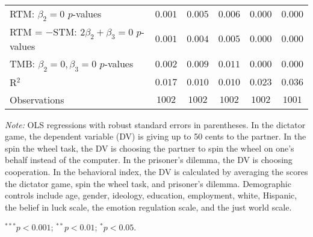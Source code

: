 \begin{table}[!t]
\begin{center}
{\begin{threeparttable}
\begin{tabular}{l c c c c c}
RTM: $\beta_2 = 0$ $p$-values                   & $0.001$        & $0.005$       & $0.006$       & $0.000$       & $0.000$       \\
RTM = $-$STM: $2\beta_2+\beta_3 = 0$ $p$-values & $0.001$        & $0.004$       & $0.005$       & $0.000$       & $0.000$       \\
TMB: $\beta_2 = 0, \beta_3 = 0$ $p$-values      & $0.002$        & $0.009$       & $0.011$       & $0.000$       & $0.000$       \\
R$^2$                                           & $0.017$        & $0.010$       & $0.010$       & $0.023$       & $0.036$       \\
Observations                                    & $1002$         & $1002$        & $1002$        & $1002$        & $1001$        \\
\bottomrule
\end{tabular}
\begin{tablenotes}[flushleft]
\scriptsize{\item[\hspace{-5mm}] \textit{Note:} OLS regressions with robust standard errors in parentheses. 
                                In the dictator game, the dependent variable (DV) is giving up to 50 cents to the partner. 
                                In the spin the wheel task, the DV is choosing the partner to spin the wheel on one’s behalf instead of the computer. 
                                In the prisoner’s dilemma, the DV is choosing cooperation. 
                                In the behavioral index, the DV is calculated by averaging the scores the dictator game, spin the wheel task, and prisoner's dilemma.
                                Demographic controls include age, gender, ideology,
                                education, employment, white, Hispanic, the belief in luck scale, the emotion regulation scale, and the just world scale. \item[\hspace{-5mm}] $^{***}p<0.001$; $^{**}p<0.01$; $^{*}p<0.05$.}
\end{tablenotes}
\end{threeparttable}
}
\label{tab:behavior_shared_regression}
\end{center}
\end{table}

\renewcommand{\baselinestretch}{1.67}%
